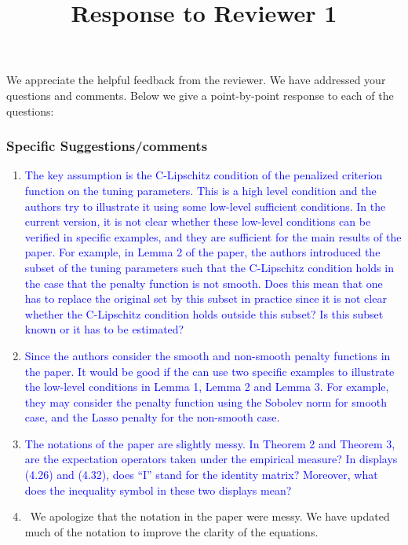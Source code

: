 \documentclass[]{article}
\title{Response to Reviewer 1}
\newcommand{\point}[1]{\item \textcolor{blue}{#1}}
\newcommand{\reply}{\item[]\ }
\begin{document}
	
	\maketitle
	
	We appreciate the helpful feedback from the reviewer. We have addressed your questions and comments. Below we give a point-by-point response to each of the questions:
	
	\subsubsection*{Specific Suggestions/comments}
	
	\begin{enumerate}
		\point{
			The key assumption is the C-Lipschitz condition of the penalized criterion function on the tuning parameters.  This is a high level condition and the authors try to illustrate it using some low-level sufficient conditions.
			In the current version, it is not clear whether these low-level conditions can be verified in specific examples, and they are sufficient for the main results of the paper.
			For example, in Lemma 2 of the paper, the authors introduced the subset of the tuning parameters such that the C-Lipschitz condition holds in the case that the penalty function is not smooth.
			Does this mean that one has to replace the original set by this subset in practice since it is not clear whether the C-Lipschitz condition holds outside this subset?
			Is this subset known or it has to be estimated?
		}
	
		\point{
			Since the authors consider the smooth and non-smooth penalty functions in the paper. It would be good if the can use two specific examples to illustrate the low-level conditions in Lemma 1, Lemma 2 and Lemma 3. For example, they may consider the penalty function using the Sobolev norm for smooth case, and the Lasso penalty for the non-smooth case.
		}
		
		\point{
		The notations of the paper are slightly messy. In Theorem 2 and Theorem 3, are the expectation operators taken under the empirical measure? In displays (4.26) and (4.32), does “I” stand for the identity matrix? Moreover, what does the inequality symbol in these two displays mean?
		}
		
		\reply We apologize that the notation in the paper were messy. We have updated much of the notation to improve the clarity of the equations.
	\end{enumerate} 
	
\end{document}
